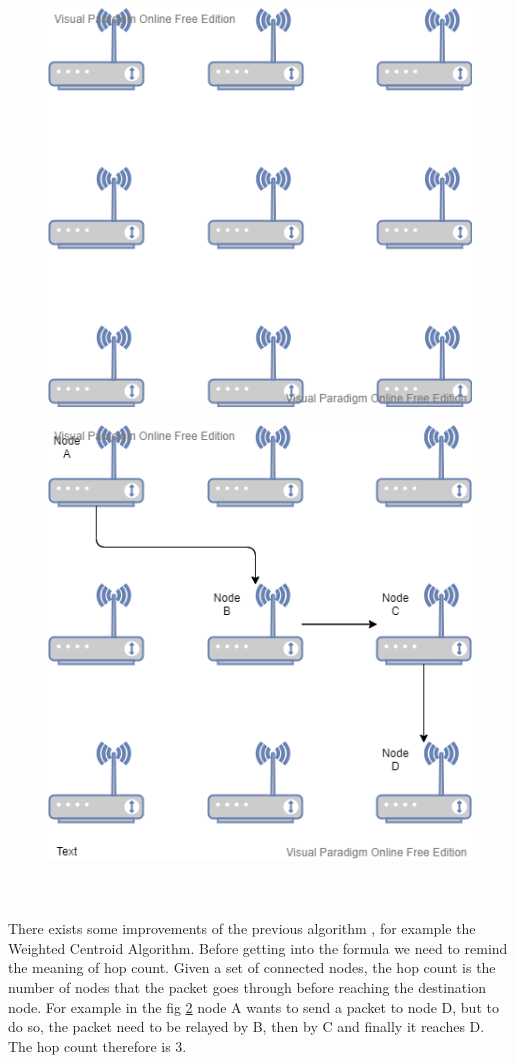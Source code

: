 \documentclass[12pt,twoside]{report}
\begin{document}
\begin{figure}[h]
\centering
\includegraphics[scale=0.6]{pic1}
\caption{}
\label{fig:3}
\end{figure}
\begin{figure}[h]
\centering
\includegraphics[scale=0.6]{pic2}
\caption{}
\label{fig:4}
\end{figure}
\\\\There exists some improvements of the previous algorithm \cite{KAUR201982}, for example the Weighted Centroid Algorithm. Before getting into the formula we need to remind the meaning of hop count. Given a set of connected nodes, the hop count is the number of nodes that the packet goes through before reaching the destination node. For example in the fig \ref{fig:4} node A wants to send a packet to node D, but to do so, the packet need to be relayed by B, then by C and finally it reaches D. The hop count therefore is 3.\\\\
\end{document}

